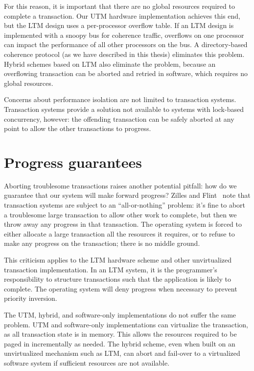 For this reason, it is important that there are no global resources
required to complete a transaction.  Our UTM hardware implementation
achieves this end, but the LTM design uses a per-processor overflow
table.  If an LTM design is implemented with a snoopy bus for
coherence traffic, overflows on one processor can impact the
performance of all other processors on the bus.  A directory-based
coherence protocol (as we have described in this thesis) eliminates
this problem.  Hybrid schemes based on LTM also eliminate the problem,
because an overflowing transaction can be aborted and retried in
software, which requires no global resources.

Concerns about performance isolation are not limited to transaction
systems.  Transaction systems provide a solution not available to
systems with lock-based concurrency, however: the offending
transaction can be safely aborted at any point to allow the other
transactions to progress.

\section{Progress guarantees}\label{sec:progress}
Aborting troublesome transactions raises another potential pitfall:
how do we guarantee that our system will make forward progress?
Zilles and Flint~\cite{ZillesFl05} note that transaction systems are
subject to an ``all-or-nothing'' problem: it's fine to abort a
troublesome large transaction to allow other work to complete, but
then we throw away any progress in that transaction.  The operating
system is forced to either allocate a large transaction all the
resources it requires, or to refuse to make any progress on the
transaction; there is no middle ground.

This criticism applies to the LTM hardware scheme and other
unvirtualized transaction implementation.  In an LTM system, it is the
programmer's responsibility to structure transactions such that the
application is likely to complete.  The operating system will deny
progress when necessary to prevent priority inversion.

The UTM, hybrid, and software-only implementations do not suffer the
same problem.  UTM and software-only implementations can virtualize
the transaction, as all transaction state is in memory.  This allows
the resources required to be paged in incrementally as
needed.  The hybrid scheme, even when built on an unvirtualized
mechanism such as LTM, can abort and fail-over to a virtualized
software system if sufficient resources are not available.

